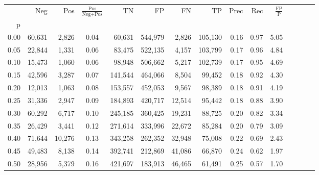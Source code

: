 \begin{tabular}{rrrcrrrrrrrrrrr}
\toprule
{} &     Neg &     Pos & $\frac{\text{Pos}}{\text{Neg}+\text{Pos}}$ &       TN &       FP &       FN &       TP &  Prec &   Rec & $\frac{\text{FP}}{\text{P}}$ \\
p    &         &         &                                            &          &          &          &          &       &       &                              \\
\midrule
0.00 &  60,631 &   2,826 &                                       0.04 &   60,631 &  544,979 &    2,826 &  105,130 &  0.16 &  0.97 &                         5.05 \\
0.05 &  22,844 &   1,331 &                                       0.06 &   83,475 &  522,135 &    4,157 &  103,799 &  0.17 &  0.96 &                         4.84 \\
0.10 &  15,473 &   1,060 &                                       0.06 &   98,948 &  506,662 &    5,217 &  102,739 &  0.17 &  0.95 &                         4.69 \\
0.15 &  42,596 &   3,287 &                                       0.07 &  141,544 &  464,066 &    8,504 &   99,452 &  0.18 &  0.92 &                         4.30 \\
0.20 &  12,013 &   1,063 &                                       0.08 &  153,557 &  452,053 &    9,567 &   98,389 &  0.18 &  0.91 &                         4.19 \\
0.25 &  31,336 &   2,947 &                                       0.09 &  184,893 &  420,717 &   12,514 &   95,442 &  0.18 &  0.88 &                         3.90 \\
0.30 &  60,292 &   6,717 &                                       0.10 &  245,185 &  360,425 &   19,231 &   88,725 &  0.20 &  0.82 &                         3.34 \\
0.35 &  26,429 &   3,441 &                                       0.12 &  271,614 &  333,996 &   22,672 &   85,284 &  0.20 &  0.79 &                         3.09 \\
0.40 &  71,644 &  10,276 &                                       0.13 &  343,258 &  262,352 &   32,948 &   75,008 &  0.22 &  0.69 &                         2.43 \\
0.45 &  49,483 &   8,138 &                                       0.14 &  392,741 &  212,869 &   41,086 &   66,870 &  0.24 &  0.62 &                         1.97 \\
0.50 &  28,956 &   5,379 &                                       0.16 &  421,697 &  183,913 &   46,465 &   61,491 &  0.25 &  0.57 &                         1.70 \\

\end{tabular}
